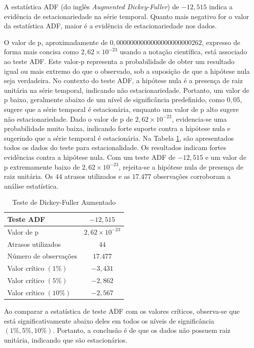 A estatística ADF (do inglês \textit{Augmented Dickey-Fuller}) de $-12,515$ indica a evidência de estacionariedade na série temporal. Quanto mais negativo for o valor da estatística ADF, maior é a evidência de estacionariedade nos dados.

O valor de p, aproximadamente de $0,0000000000000000000000262$, expresso de forma mais concisa como $2,62\times 10^{-23}$ usando a notação científica, está associado ao teste ADF. Este valor-p representa a probabilidade de obter um resultado igual ou mais extremo do que o observado, sob a suposição de que a hipótese nula seja verdadeira. No contexto do teste ADF, a hipótese nula é a presença de raiz unitária na série temporal, indicando não estacionariedade. Portanto, um valor de p baixo, geralmente abaixo de um nível de significância predefinido, como $0,05$, sugere que a série temporal é estacionária, enquanto um valor de p alto sugere não estacionariedade. Dado o valor de p de $2,62\times 10^{-23}$, evidencia-se uma probabilidade muito baixa, indicando forte suporte contra a hipótese nula e sugerindo que a série temporal é estacionária. Na Tabela \ref{tb:adf}, são apresentados todos os dados do teste para estacionalidade.
Os resultados indicam fortes evidências contra a hipótese nula. Com um teste ADF de $-12,515 $ e um valor de p extremamente baixo de $2,62 \times 10^{-23}$, rejeita-se a hipótese nula de presença de raiz unitária. Os $44$ atrasos utilizados e as $17.477$ observações corroboram a análise estatística.

\begin{table}[!htb]
	\centering
	\caption{Teste de Dickey-Fuller Aumentado}\label{tb:adf}
	\begin{tabular}{lc}
		\hline
		Teste ADF & $-12,515$ \\ \hline
		Valor de p & $2,62 \times 10^{-23}$ \\
		Atrasos utilizados & $44$ \\
		Número de observações & $17.477$ \\
		Valor crítico $(1\%)$ & $-3,431$ \\
		Valor crítico $(5\%)$ & $-2,862$ \\
		Valor crítico $(10\%)$ & $-2,567$ \\
		\hline
	\end{tabular}
\end{table}




Ao comparar a estatística de teste ADF com os valores críticos, observa-se que está significativamente abaixo deles em todos os níveis de significância $(1\%, 5\%, 10\%)$. Portanto, a conclusão é de que os dados não possuem raiz unitária, indicando que são estacionários.

